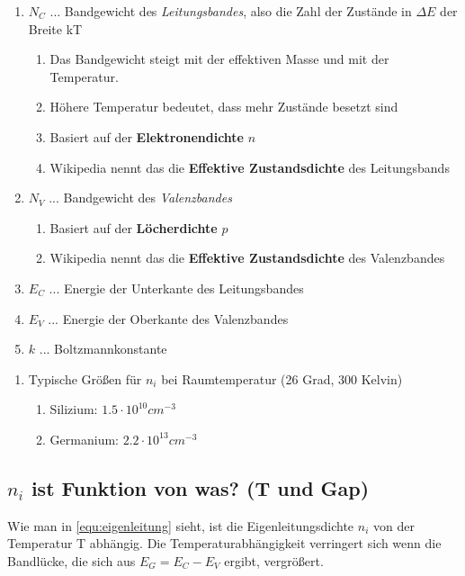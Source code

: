 	\begin{enumerate}
	    \item $N_C$ ... Bandgewicht des \emph{Leitungsbandes}, also die Zahl der Zustände in $\Delta E$ der Breite kT
	    \begin{enumerate}
	        \item Das Bandgewicht steigt mit der effektiven Masse und mit der Temperatur.
	        \item Höhere Temperatur bedeutet, dass mehr Zustände besetzt sind
	        \item Basiert auf der \textbf{Elektronendichte} $n$
	        \item Wikipedia nennt das die \textbf{Effektive Zustandsdichte} des Leitungsbands
	    \end{enumerate}
	    \item $N_V$ ... Bandgewicht des \emph{Valenzbandes}
	    \begin{enumerate}
	        \item Basiert auf der \textbf{Löcherdichte} $p$
	        \item Wikipedia nennt das die \textbf{Effektive Zustandsdichte} des Valenzbandes
	    \end{enumerate}
	    \item $E_C$ ... Energie der Unterkante des Leitungsbandes
	    \item $E_V$ ... Energie der Oberkante des Valenzbandes
	    \item $k$ ... Boltzmannkonstante
	\end{enumerate}
	
	\begin{enumerate}
	    \item Typische Größen für $n_i$ bei Raumtemperatur (26 Grad, 300 Kelvin)
	    \begin{enumerate}
	        \item Silizium: $1.5 \cdot 10^{10} cm^{-3}$
	        \item Germanium: $2.2 \cdot 10^{13} cm^{-3}$
	    \end{enumerate}
	\end{enumerate}
	
	\subsection{$n_i$ ist Funktion von was? (T und Gap)}
    Wie man in \autoref{equ:eigenleitung} sieht, ist die Eigenleitungsdichte $n_i$ von der Temperatur T abhängig.
    Die Temperaturabhängigkeit verringert sich wenn die Bandlücke, die sich aus $E_G = E_C - E_V$ ergibt, vergrößert. 
    
